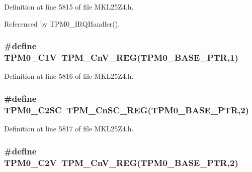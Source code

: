 Definition at line 5815 of file M\+K\+L25\+Z4.\+h.



Referenced by T\+P\+M0\+\_\+\+I\+R\+Q\+Handler().

\subsubsection[{\texorpdfstring{T\+P\+M0\+\_\+\+C1V}{TPM0_C1V}}]{\setlength{\rightskip}{0pt plus 5cm}\#define T\+P\+M0\+\_\+\+C1V~{\bf T\+P\+M\+\_\+\+Cn\+V\+\_\+\+R\+EG}({\bf T\+P\+M0\+\_\+\+B\+A\+S\+E\+\_\+\+P\+TR},1)}\hypertarget{group___t_p_m___register___accessor___macros_ga1ed6a839f9ad1c2ae66f8ba73ded3f57}{}\label{group___t_p_m___register___accessor___macros_ga1ed6a839f9ad1c2ae66f8ba73ded3f57}


Definition at line 5816 of file M\+K\+L25\+Z4.\+h.

\subsubsection[{\texorpdfstring{T\+P\+M0\+\_\+\+C2\+SC}{TPM0_C2SC}}]{\setlength{\rightskip}{0pt plus 5cm}\#define T\+P\+M0\+\_\+\+C2\+SC~{\bf T\+P\+M\+\_\+\+Cn\+S\+C\+\_\+\+R\+EG}({\bf T\+P\+M0\+\_\+\+B\+A\+S\+E\+\_\+\+P\+TR},2)}\hypertarget{group___t_p_m___register___accessor___macros_ga8bdd3e71a35ffc62ee86426c74ac5139}{}\label{group___t_p_m___register___accessor___macros_ga8bdd3e71a35ffc62ee86426c74ac5139}


Definition at line 5817 of file M\+K\+L25\+Z4.\+h.

\subsubsection[{\texorpdfstring{T\+P\+M0\+\_\+\+C2V}{TPM0_C2V}}]{\setlength{\rightskip}{0pt plus 5cm}\#define T\+P\+M0\+\_\+\+C2V~{\bf T\+P\+M\+\_\+\+Cn\+V\+\_\+\+R\+EG}({\bf T\+P\+M0\+\_\+\+B\+A\+S\+E\+\_\+\+P\+TR},2)}\hypertarget{group___t_p_m___register___accessor___macros_ga590a236d1f3abc5f8a4958a883c5ed00}{}\label{group___t_p_m___register___accessor___macros_ga590a236d1f3abc5f8a4958a883c5ed00}



